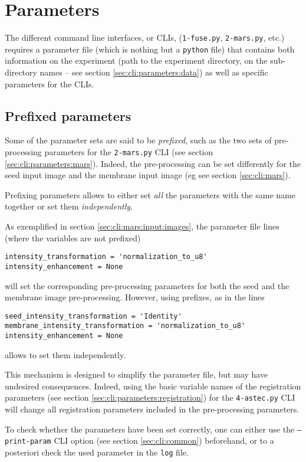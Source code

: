\section{Parameters}
\label{sec:cli:parameters}


The different command line interfaces, or CLIs, (\texttt{1-fuse.py}, \texttt{2-mars.py}, etc.) requires a parameter file (which is nothing but a \texttt{python} file) that contains both information on the experiment (path to the experiment directory, on the sub-directory names -- see section \ref{sec:cli:parameters:data}) as well as specific parameters for the CLIs.

\subsection{Prefixed parameters}

Some of the parameter sets are said to be \textit{prefixed}, such as the two sets of pre-processing parameters for the \texttt{2-mars.py} CLI (see section \ref{sec:cli:parameters:mars}). Indeed, the pre-processing can be set differently for the seed input image and the membrane input image (eg see section \ref{sec:cli:mars}).

Prefixing parameters allows to either set \textit{all} the parameters with the same name together or set them \textit{independently}.

As exemplified in section \ref{sec:cli:mars:input:images}, 
the parameter file lines (where the variables are not prefixed)
\begin{verbatim}
intensity_transformation = 'normalization_to_u8'
intensity_enhancement = None
\end{verbatim}
will set the corresponding pre-processing parameters for both the seed and the membrane image pre-processing.
However, using prefixes, as in the lines
\begin{verbatim}
seed_intensity_transformation = 'Identity'
membrane_intensity_transformation = 'normalization_to_u8'
intensity_enhancement = None
\end{verbatim}
allows to set them independently.

This mechanism is designed to simplify the parameter file, but may have undesired consequences. Indeed, using the basic variable names of the registration parameters (see section \ref{sec:cli:parameters:registration})  for the \texttt{4-astec.py} CLI will change all registration parameters included in the pre-processing parameters.

To check whether the parameters have been set correctly, one can either use
the \texttt{--print-param} CLI option (see section \ref{sec:cli:common}) beforehand, or to a posteriori check the used parameter in the \texttt{log} file. 
  
